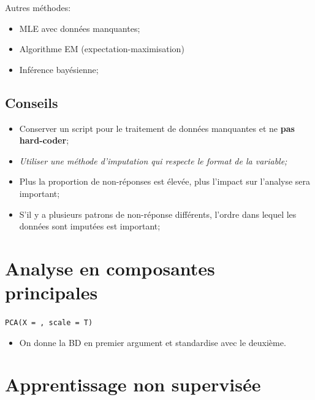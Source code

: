 \documentclass[10pt, french]{article}
\begin{document}
\begin{multicols*}{3}
Autres méthodes:
\begin{itemize}[leftmargin = *]
	\item	MLE avec données manquantes;
	\item	Algorithme EM (expectation-maximisation)
	\item	Inférence bayésienne;
\end{itemize}

\subsection*{Conseils}
\begin{itemize}[leftmargin = *]
	\item	Conserver un script pour le traitement de données manquantes et ne \textbf{pas hard-coder};
	\item	\textit{Utiliser une méthode d'imputation qui respecte le format de la variable;}
	\item	Plus la proportion de non-réponses est élevée, plus l'impact sur l'analyse sera important;
	\item	S'il y a plusieurs patrons de non-réponse différents, l'ordre dans lequel les données sont imputées est important;
\end{itemize}

\newpage

\section{Analyse en composantes principales}

\begin{definitionNOHFILLsub}
\texttt{PCA(X = , scale = T)}
\begin{itemize}
	\item	On donne la BD en premier argument et standardise avec le deuxième.
\end{itemize}
\end{definitionNOHFILLsub}

\newpage

\section{Apprentissage non supervisée}


\end{multicols*}
\end{document}
